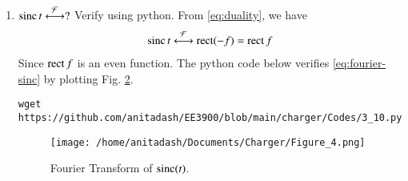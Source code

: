 \documentclass[journal,12pt,twocolumn]{IEEEtran}
\renewcommand\thesection{\arabic{section}}
\begin{document}
\begin{enumerate}[label=\thesection.\arabic*
,ref=\thesection.\theenumi]
\begin{align}
    \rect{t} \system{F} \sinc{f}
\end{align}
Verify using python.
\solution We write
\begin{align}
    \rect{t}&\system{F}\int_{-\infty}^{\infty}\rect{t}e^{-\j2\pi ft}\, dt \\
            &=\int_{-\frac{1}{2}}^{\frac{1}{2}}e^{-\j2\pi ft}\, dt \\
            &=\frac{e^{\j\pi f} - e^{-\j\pi f}}{\j2\pi f} = \frac{\sin{\pi f}}{\pi f} = \sinc{f}
            \label{eq:fourier-rect}
\end{align}
The python code below verifies \eqref{eq:fourier-rect}
by plotting Fig. \ref{fig:fourier-rect}.
\begin{lstlisting}
wget https://github.com/anitadash/EE3900/blob/main/charger/Codes/3_9.py
\end{lstlisting}
\begin{figure}[!ht]
    \texttt{[image: /home/anitadash/Documents/Charger/Figure\_6.png]}
    \caption{Fourier Transform of $\rect(t)$.}
    \label{fig:fourier-rect}
\end{figure}
\item $\mathop{\mathrm{sinc}}{t}\overset{\mathcal{F}}{ \longleftrightarrow} ?$  Verify using python.
\solution From \eqref{eq:duality}, we have 
\begin{align}
    \mathop{\mathrm{sinc}}{t}\overset{\mathcal{F}}{ \longleftrightarrow}\mathop{\mathrm{rect}}(-f)=\mathop{\mathrm{rect}}{f}
    \label{eq:fourier-sinc}
\end{align}
Since $\mathop{\mathrm{rect}}{f}$ is an even function.
The python code below verifies \eqref{eq:fourier-sinc}
by plotting Fig. \ref{fig:fourier-sinc}.
\begin{lstlisting}
wget https://github.com/anitadash/EE3900/blob/main/charger/Codes/3_10.py
\end{lstlisting}
\begin{figure}[!ht]
    \texttt{[image: /home/anitadash/Documents/Charger/Figure\_4.png]}
    \caption{Fourier Transform of $\mathop{\mathrm{sinc}}(t)$.}
    \label{fig:fourier-sinc}
\end{figure}
\end{enumerate}
\end{document}
